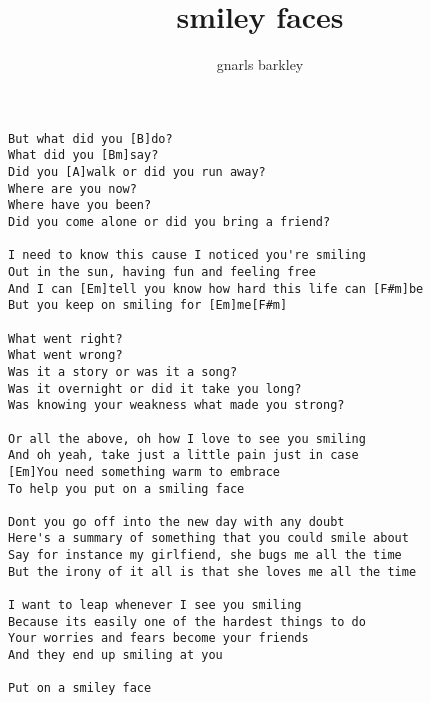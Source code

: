 \author{gnarls barkley}
\title{smiley faces}
\maketitle
\begin{verbatim}
But what did you [B]do?
What did you [Bm]say?
Did you [A]walk or did you run away?
Where are you now?
Where have you been?
Did you come alone or did you bring a friend?

I need to know this cause I noticed you're smiling
Out in the sun, having fun and feeling free
And I can [Em]tell you know how hard this life can [F#m]be
But you keep on smiling for [Em]me[F#m]

What went right?
What went wrong?
Was it a story or was it a song?
Was it overnight or did it take you long?
Was knowing your weakness what made you strong?

Or all the above, oh how I love to see you smiling
And oh yeah, take just a little pain just in case
[Em]You need something warm to embrace
To help you put on a smiling face

Dont you go off into the new day with any doubt
Here's a summary of something that you could smile about
Say for instance my girlfiend, she bugs me all the time
But the irony of it all is that she loves me all the time

I want to leap whenever I see you smiling
Because its easily one of the hardest things to do
Your worries and fears become your friends
And they end up smiling at you

Put on a smiley face
\end{verbatim}
